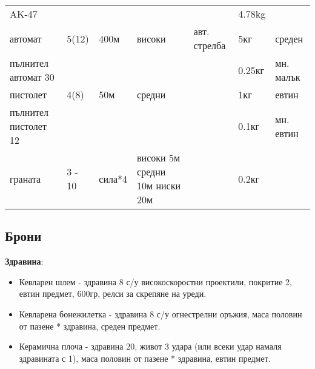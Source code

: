 \begin{tabular}{p{2cm} | p{2cm} | p{2cm} | p{2cm} | p{2cm} | p{2cm} | p{2cm}}
AK-47                 &                      &            &            &                & 4.78kg        &                  \\  %
%
автомат               & 5(12)                & 400м       & високи     & авт. стрелба   & 5кг           & среден           \\
пълнител автомат 30   &                      &            &            &                & 0.25кг        & мн. малък        \\
пистолет              & 4(8)                 & 50м        & средни     &                & 1кг           & евтин            \\  %
пълнител пистолет 12  &                      &            &            &                & 0.1кг         & мн. евтин        \\
граната               & 3 - 10               & сила*4     & високи 5м средни 10м ниски 20м & & 0.2кг    &                  \\

\end{tabular}

\subsection{Брони}
\textbf{Здравина}:
\begin{itemize}[topsep=-0cm, partopsep=0cm, parsep=0cm, itemsep=0cm]
\item{Кевларен шлем - здравина 8 с/у високоскоростни проектили, покритие 2, евтин предмет, 600гр, релси за скрепяне на уреди.}
\item{Кевларена бонежилетка - здравина 8 с/у огнестрелни оръжия, маса половин от пазене * здравина, среден предмет.}
\item{Керамична плоча - здравина 20, живот 3 удара (или всеки удар намаля здравината с 1), маса половин от пазене * здравина, евтин предмет.}
\end{itemize}
